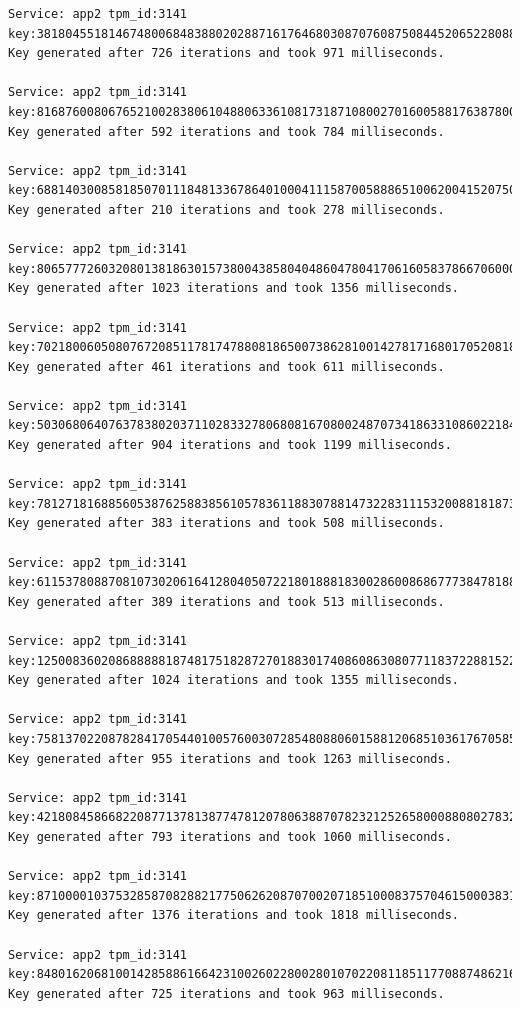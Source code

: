 \begin{lstlisting}
Service: app2 tpm_id:3141 key:381804551814674800684838802028871617646803087076087508445206522808800300
Key generated after 726 iterations and took 971 milliseconds.

Service: app2 tpm_id:3141 key:816876008067652100283806104880633610817318710800270160058817638780016740
Key generated after 592 iterations and took 784 milliseconds.

Service: app2 tpm_id:3141 key:688140300858185070111848133678640100041115870058886510062004152075081203
Key generated after 210 iterations and took 278 milliseconds.

Service: app2 tpm_id:3141 key:806577726032080138186301573800438580404860478041706160583786670600078581
Key generated after 1023 iterations and took 1356 milliseconds.

Service: app2 tpm_id:3141 key:702180060508076720851178174788081865007386281001427817168017052081854782
Key generated after 461 iterations and took 611 milliseconds.

Service: app2 tpm_id:3141 key:503068064076378380203711028332780680816708002487073418633108602218478831
Key generated after 904 iterations and took 1199 milliseconds.

Service: app2 tpm_id:3141 key:781271816885605387625883856105783611883078814732283111532008818187333400
Key generated after 383 iterations and took 508 milliseconds.

Service: app2 tpm_id:3141 key:611537808870810730206164128040507221801888183002860086867773847818878187
Key generated after 389 iterations and took 513 milliseconds.

Service: app2 tpm_id:3141 key:125008360208688888187481751828727018830174086086308077118372288152205006
Key generated after 1024 iterations and took 1355 milliseconds.

Service: app2 tpm_id:3141 key:758137022087828417054401005760030728548088060158812068510361767058585170
Key generated after 955 iterations and took 1263 milliseconds.

Service: app2 tpm_id:3141 key:421808458668220877137813877478120780638870782321252658000880802783200008
Key generated after 793 iterations and took 1060 milliseconds.

Service: app2 tpm_id:3141 key:871000010375328587082882177506262087070020718510008375704615000383101016
Key generated after 1376 iterations and took 1818 milliseconds.

Service: app2 tpm_id:3141 key:848016206810014285886166423100260228002801070220811851177088748621670808
Key generated after 725 iterations and took 963 milliseconds.


\end{lstlisting}
